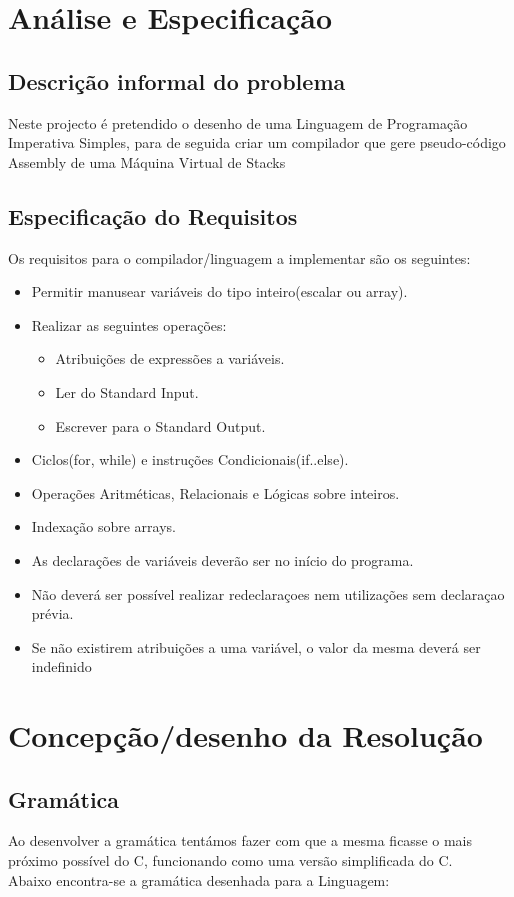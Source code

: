 \documentclass{report}
\begin{document}
\chapter{Análise e Especificação} \label{analiseEsp}

\section{Descrição informal do problema}
Neste projecto é pretendido o desenho de uma Linguagem de Programação Imperativa Simples, para de seguida criar um compilador que gere pseudo-código Assembly de uma Máquina Virtual de Stacks
\section{Especificação do Requisitos}
Os requisitos para o compilador/linguagem a implementar são os seguintes:
\begin{itemize}
  \item Permitir manusear variáveis do tipo inteiro(escalar ou array).
  \item Realizar as seguintes operações:
	\begin{itemize}
	\item Atribuições de expressões a variáveis.
	\item Ler do Standard Input.
	\item Escrever para o Standard Output.
	\end{itemize}
 \item Ciclos(for, while) e instruções Condicionais(if..else).
 \item Operações Aritméticas, Relacionais e Lógicas sobre inteiros.
 \item Indexação sobre arrays.
 \item As declarações de variáveis deverão ser no início do programa.
 \item Não deverá ser possível realizar redeclaraçoes nem utilizações sem declaraçao prévia.
 \item Se não existirem atribuições a uma variável, o valor da mesma deverá ser indefinido
\end{itemize}

\chapter{Concepção/desenho da Resolução} \label{concepcao}
\section{Gramática}
Ao desenvolver a gramática tentámos fazer com que a mesma ficasse o mais próximo possível do C, funcionando como uma versão simplificada do C.\\Abaixo encontra-se a gramática desenhada para a Linguagem:
\end{document}
